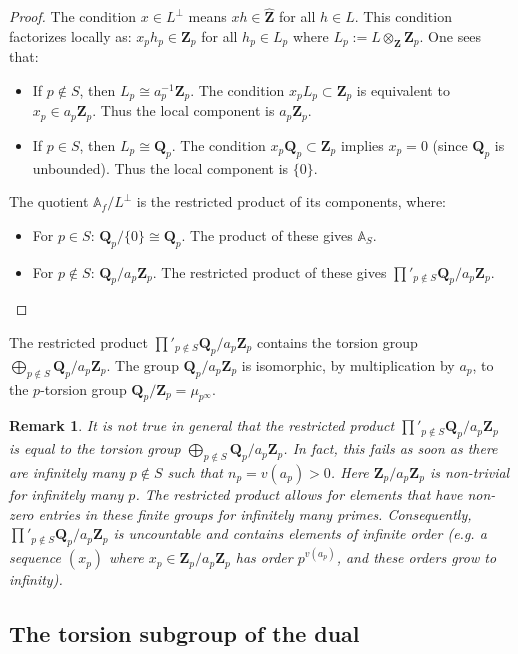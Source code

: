 \documentclass[11pt,a4paper]{article}
\newcommand{\Q}{\mathbf{Q}}
\newcommand{\Z}{\mathbf{Z}}
\newcommand{\A}{\mathbb{A}}
\theoremstyle{plain}
\newtheorem{rem}[thm]{Remark}
\theoremstyle{definition} %
\begin{document}
\begin{proof}
The condition $x \in L^\perp$ means $x h \in \widehat{\Z}$ for all $h \in L$. This condition factorizes locally as: $x_p h_p \in \Z_p$ for all $h_p \in L_p$ where $L_p:=L\otimes_\Z \Z_p$. One sees that:
\begin{itemize}[leftmargin=*, labelindent=0pt]
    \item[] If $p \notin S$, then $L_p \cong a_p^{-1} \Z_p$. The condition $x_p L_p \subset \Z_p$ is equivalent to  $x_p \in a_p\Z_p$. Thus the local component is $a_p\Z_p$.
    \item[] If $p \in S$, then $L_p \cong \Q_p$. The condition $x_p \Q_p \subset \Z_p$ implies $x_p = 0$ (since $\Q_p$ is unbounded). Thus the local component is $\{0\}$.
\end{itemize}
The quotient $\A_f / L^\perp$ is  the restricted product of its components, where:
\begin{itemize}[leftmargin=*, labelindent=0pt]
\item[] For $p \in S$: $\Q_p / \{0\} \cong \Q_p$. The product of these gives $\A_S$.
    \item[] For $p \notin S$: $\Q_p /a_p \Z_p$. The restricted product of these gives $\prod'_{p \notin S} \Q_p/a_p\Z_p$.  
\end{itemize}
\end{proof}
The restricted product $\prod'_{p \notin S} \Q_p/a_p\Z_p$ contains the torsion group $\bigoplus_{p \notin S} \Q_p/a_p\Z_p$. The group $\Q_p/a_p\Z_p$ is isomorphic, by multiplication by $a_p$, to the $p$-torsion group $\Q_p/\Z_p=\mu_{p^\infty}$.

\begin{rem}It is not true in general that the restricted product $\prod'_{p \notin S} \Q_p/a_p\Z_p$ is equal to the torsion group $\bigoplus_{p \notin S} \Q_p/a_p\Z_p$. In fact,  this fails as soon as there are infinitely many $p\notin S$ such that  
$n_p=v(a_p)>0$. 
Here $\Z_p / a_p \Z_p$ is non-trivial for infinitely many $p$. The restricted product allows for elements that have non-zero entries in these finite groups for infinitely many primes. Consequently, $\prod'_{p \notin S} \Q_p/a_p\Z_p$ is uncountable and contains elements of infinite order (e.g.  a sequence $(x_p)$ where $x_p \in \Z_p/a_p\Z_p$ has order $p^{v(a_p)}$, and these orders grow to infinity).
\end{rem}
\subsection{The torsion subgroup of the dual}
\end{document}
